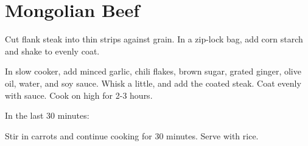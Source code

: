 \section{Mongolian Beef}
\begin{recipe}
	
	

	Cut flank steak into thin strips against grain. In a zip-lock bag, add corn starch and shake to evenly coat.
	
	In slow cooker, add minced garlic, chili flakes, brown sugar, grated ginger, olive oil, water, and soy sauce. Whisk a little, and add the coated steak. Coat evenly with sauce. Cook on high for 2-3 hours.
	
	In the last 30 minutes:	
	
	
	Stir in carrots and continue cooking for 30 minutes. Serve with rice.
	
\end{recipe}
